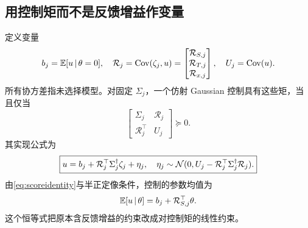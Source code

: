 \documentclass[UTF8,fontset=fandol,11pt,a4paper]{ctexart}
\DeclareMathOperator{\Cov}{Cov}\DeclareMathOperator{\im}{im}\DeclareMathOperator{\rank}{rank}
\theoremstyle{definition}\newtheorem{definition}[theorem]{定义}\newtheorem{assumption}[theorem]{条件}
\numberwithin{equation}{section}
\begin{document}
\subsection{用控制矩而不是反馈增益作变量}
定义变量
\begin{equation}
b_j=\E[u\given\theta=0],\quad
\mathcal R_j=\Cov(\zeta_j,u)
=\begin{bmatrix}\mathcal R_{S,j}\\\mathcal R_{T,j}\\\mathcal R_{x,j}\end{bmatrix},
\quad U_j=\Cov(u).
\end{equation}
所有协方差指未选择模型。对固定 $\Sigma_j$，一个仿射 Gaussian 控制具有这些矩，当且仅当
\begin{equation}
\boxed{\begin{bmatrix}\Sigma_j&\mathcal R_j\\\mathcal R_j^\top&U_j\end{bmatrix}\succeq0.}
\label{eq:momentLMI}
\end{equation}
其实现公式为
\begin{equation}
\boxed{u=b_j+\mathcal R_j^\top\Sigma_j^\dagger\zeta_j+\eta_j,\quad
\eta_j\sim\mathcal N(0,U_j-\mathcal R_j^\top\Sigma_j^\dagger\mathcal R_j).}
\label{eq:statecontrol}
\end{equation}
由\eqref{eq:scoreidentity}与半正定像条件，控制的参数均值为
\begin{equation}
\mathbb E[u\,|\,\theta]=b_j+\mathcal R_{S,j}^\top\theta.
\label{eq:controlmean}
\end{equation}
这个恒等式把原本含反馈增益的约束改成对控制矩的线性约束。
\end{document}

